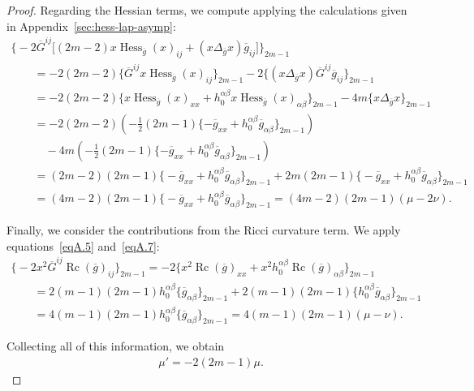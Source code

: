 \documentclass[pdftex]{sigma}
\numberwithin{equation}{section}
\newcommand{\olg}{\overline{g}}
\newcommand{\olG}{\overline{G}}
\newcommand{\gbar}{\overline{g}}
\DeclareMathOperator{\Rc}{Rc}
\DeclareMathOperator{\hess}{Hess}
\begin{document}
\begin{proof}
Regarding the Hessian terms, we compute applying the calculations given in Appendix~\ref{sec:hess-lap-asymp}:
\begin{gather*}%
\big\{{-}2 \olG^{ij}\big[ (2m-2) x\hess_{\olg} (x)_{ij} +(x\Delta_{\olg} x) \olg_{ij} \big]\big\}_{2m-1} \\
\qquad{} = -2 (2m-2) \big\{ \olG^{ij} x\hess_{\olg} (x)_{ij}\big\}_{2m-1} -2 \big\{ (x\Delta_{\olg} x) \olG^{ij} \gbar_{ij}\big\}_{2m-1}\\
\qquad{} = -2 (2m-2) \big\{ x\hess_{\olg} (x)_{xx} + h_0^{\alpha \beta} x\hess_{\olg} (x)_{\alpha \beta}\big\}_{2m-1} -4m \{ x\Delta_{\olg} x\}_{2m-1} \\
\qquad{} = -2( 2m-2) \left( -\frac{1}{2} (2m-1) \{ -\gbar_{xx}+h^{\alpha \beta}_0 \gbar_{\alpha \beta} \}_{2m-1}\right) \\
\qquad \quad{}- 4m \left(-\frac{1}{2} (2m-1) \{ -\gbar_{xx} + h^{\alpha \beta}_0 \gbar_{\alpha \beta} \}_{2m-1}\right) \\
\qquad{}= ( 2m-2) (2m-1) \big\{ {-}\gbar_{xx}+h^{\alpha \beta}_0 \gbar_{\alpha \beta} \big\}_{2m-1}+ 2m (2m-1) \big\{ {-}\gbar_{xx} + h^{\alpha \beta}_0 \gbar_{\alpha \beta} \big\}_{2m-1} \\
\qquad{}= ( 4m-2) (2m-1) \big\{ {-}\gbar_{xx}+h^{\alpha \beta}_0 \gbar_{\alpha \beta} \big\}_{2m-1} = (4m-2)(2m-1) (\mu - 2\nu).
\end{gather*}

Finally, we consider the contributions from the Ricci curvature term. We apply equations~\eqref{eqA.5} and~\eqref{eqA.7}:
\begin{gather*}%
\big\{{-}2 x^2\olG^{ij}\Rc(\gbar)_{ij}\big\}_{2m-1} = -2 \big\{ x^2 \Rc(\gbar)_{xx} + x^2 h^{\alpha \beta}_0 \Rc(\gbar)_{\alpha \beta} \big\}_{2m-1} \\
\qquad {} = 2(m-1)(2m-1) h^{\alpha \beta}_0 \{\gbar_{\alpha \beta}\}_{2m-1} + 2(m-1)(2m-1) \big\{ h^{\alpha \beta}_0\gbar_{\alpha \beta}\big\}_{2m-1}\\
\qquad{} = 4(m-1)(2m-1) h^{\alpha \beta}_0 \{\gbar_{\alpha \beta}\}_{2m-1} = 4(m-1)(2m-1) (\mu - \nu).
\end{gather*}

Collecting all of this information, we obtain
\begin{gather*}%
\mu' = -2 (2m-1) \mu.
\end{gather*}


\end{proof}
\end{document}
